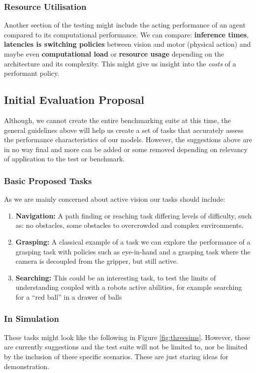 \subsubsection{Resource Utilisation}
Another section of the testing might include the acting performance of an agent compared to its computational performance. We can compare: \textbf{inference times}, \textbf{latencies is switching policies} between vision and motor (physical action) and maybe even \textbf{computational load} or \textbf{resource usage} depending on the architecture and its complexity. This might give us insight into the \emph{costs} of a performant policy.

\subsection{Initial Evaluation Proposal}
Although, we cannot create the entire benchmarking suite at this time, the general guidelines above will help us create a set of tasks that accurately assess the performance characteristics of our models. However, the suggestions above are in no way final and more can be added or some removed depending on relevancy of application to the test or benchmark.

\subsubsection{Basic Proposed Tasks}
As we are mainly concerned about active vision our tasks should include:
\begin{enumerate}
  \item \textbf{Navigation:} A path finding or reaching task differing levels of difficulty, such as: no obstacles, some obstacles to overcrowded and complex environments.
  \item \textbf{Grasping:} A classical example of a task we can explore the performance of a grasping task with policies such as eye-in-hand and a grasping task where the camera is decoupled from the gripper, but still active.
  \item \textbf{Searching:} This could be an interesting task, to test the limits of understanding coupled with a robots active abilities, for example searching for a ``red ball'' in a drawer of balls
\end{enumerate}

\subsubsection{In Simulation}
These tasks might look like the following in Figure \ref{fig:threesims}. However, these are currently suggestions and the test suite will not be limited to, nor be limited by the inclusion of these specific scenarios. These are just staring ideas for demonstration.

